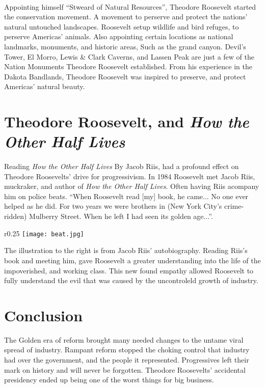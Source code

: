 \paragraph{}
Appointing himself ``Stweard of Natural Resources'', Theodore Roosevelt
started the conservation movement. A movement to perserve and protect
the nations' natural untouched landscapes. Roosevelt setup wildlife and
bird refuges, to perserve Americas' animals. Also appointing certain
locations as national landmarks, monuments, and historic areas, Such
as the grand canyon. Devil's Tower, El Morro, Lewis \& Clark Caverns, and
Lassen Peak are just a few of the Nation Monuments Theodore Roosevelt
established. From his experience in the Dakota Bandlands, Theodore Roosevelt
was inspired to preserve, and protect Americas' natural beauty.

\section{Theodore Roosevelt, and \textit{How the Other Half Lives}}
\paragraph{}
Reading \textit{How the Other Half Lives} By Jacob Riis, had a profound
effect on Theodore Roosevelts' drive for progressivism. In 1984 Roosevelt
met Jacob Riis, muckraker, and author of \textit{How the Other Half Lives}.
Often having Riis acompany him on police beats. ``When Roosevelt read [my]
book, he came... No one ever helped as he did. For two years we were brothers
in (New York City's crime-ridden) Mulberry Street. When he left I had seen its
golden age...''\cite{jacobriis1901}.\\

\begin{wrapfigure}{r}{0.25\textwidth}
	\centering
	\texttt{[image: beat.jpg]}
\end{wrapfigure}

The illustration to the right is from Jacob Riis' autobiography.
\cite{jacobriis1901}
Reading Riis's book and meeting him, gave Roosevelt a greater understanding
into the life of the impoverished, and working class. This new found empathy
allowed Roosevelt to fully understand the evil that was caused by the
uncontroleld growth of industry.

\section{Conclusion}
The Golden era of reform brought many needed changes to the untame
viral spread of industry. Rampant reform stopped the choking control
that industry had over the government, and the people it represented.
Progressives left their mark on history and will never be forgotten.
Theodore Roosevelts' accidental presidency ended up being one of the
worst things for big business.

\newpage
\printbibliography
